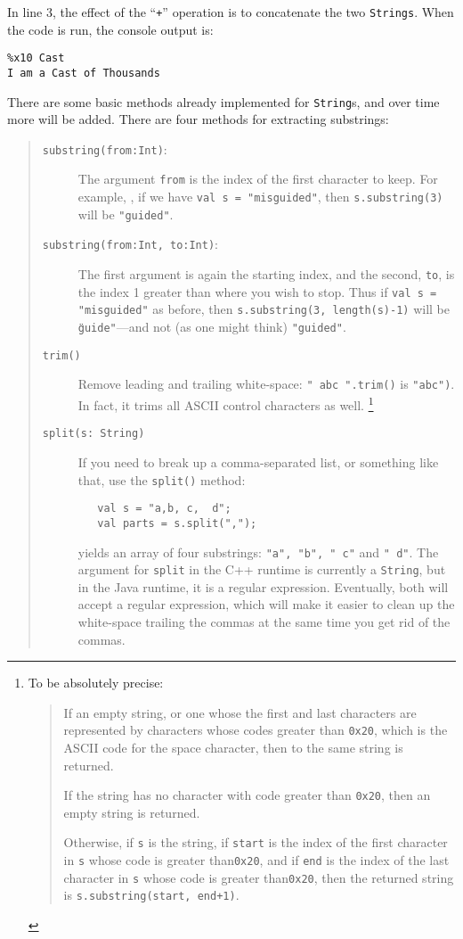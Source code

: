 In line 3, the effect of the ``{\tt +}'' operation is to concatenate the two
{\tt Strings}.  When the code is run, the console output is:
\begin{verbatim}
%x10 Cast 
I am a Cast of Thousands
\end{verbatim}

There are some basic methods already implemented for {\tt String}s, and over
time more will be added. 
There are four methods for extracting substrings:
\begin{quote}
\begin{description}
\item[{\tt  substring(from:Int)}:] The argument {\tt from} is the index of the first
character to keep.  For example, , if we have {\tt val s = "misguided"}, then 
{\tt s.substring(3)} will be  {\tt "guided"}.
\item[{\tt substring(from:Int, to:Int)}:] The first argument is again the starting
index, and the second, {\tt to}, is the index 1 greater than where you
wish to stop.  Thus if {\tt val s = "misguided"} as before, then
{\tt s.substring(3, length(s)-1)} will be {\tt \"guide"}---and not (as one might
think) {\tt "guided"}.
\item[{\tt trim()}] Remove leading and trailing white-space: {\tt "  abc ".trim()}
is {\tt "abc")}.  In fact, it trims all ASCII control characters as well.
\footnote{ To be absolutely precise:
\begin{quote}
If an empty string, or one whose the first and last characters are represented
by characters whose codes greater than {\tt 0x20}, which is the ASCII code for
the space character, then to the same string is returned.

If the string has no character with code greater than {\tt 0x20}, 
then an empty string is returned.

Otherwise, if {\tt s} is the string, if {\tt start} is the index of the first character in
{\tt s} whose code is greater than{\tt 0x20}, and if {\tt end} is the index of the last
character in {\tt s} whose code is greater than{\tt 0x20}, then the returned string
is {\tt s.substring(start, end+1)}.
\end{quote}
}
\item[{\tt split(s: String)}]  If you need to break up a comma-separated
list, or something like that, use the {\tt split()} method:
\begin{verbatim}
   val s = "a,b, c,  d";
   val parts = s.split(",");
\end{verbatim}
yields an array of four substrings: {\tt "a", "b", " c"} and {\tt "  d"}.
The argument for {\tt split}  in the C++ runtime is currently a {\tt String},
but in the Java runtime, it is a regular expression.   
Eventually, both will accept a regular expression, which will make it
easier to clean up the white-space trailing the commas at the same
time you get rid of the commas.
\end{description}
\end{quote}


